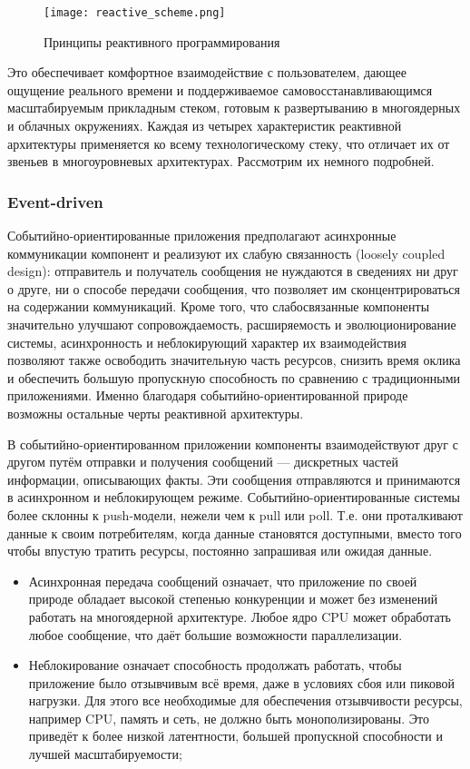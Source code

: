 \begin{figure}[ht]
\centering
  \texttt{[image: reactive\_scheme.png]}
  \caption{ Принципы реактивного программирования }
  \label{fig:reactive_scheme}
\end{figure}

Это обеспечивает комфортное взаимодействие с пользователем, дающее ощущение реального времени и поддерживаемое самовосстанавливающимся масштабируемым прикладным стеком, готовым к развертыванию в многоядерных и облачных окружениях. Каждая из четырех характеристик реактивной архитектуры применяется ко всему технологическому стеку, что отличает их от звеньев в многоуровневых архитектурах. Рассмотрим их немного подробней.

\subsubsection{Event-driven}
\label{subsub:domain:reactive_programming:event_driven}

Событийно-ориентированные приложения предполагают асинхронные коммуникации компонент и реализуют их слабую связанность (loosely coupled design): отправитель и получатель сообщения не нуждаются в сведениях ни друг о друге, ни о способе передачи сообщения, что позволяет им сконцентрироваться на содержании коммуникаций. Кроме того, что слабосвязанные компоненты значительно улучшают сопровождаемость, расширяемость и эволюционирование системы, асинхронность и неблокирующий характер их взаимодействия позволяют также освободить значительную часть ресурсов, снизить время оклика и обеспечить большую пропускную способность по сравнению с традиционными приложениями. Именно благодаря событийно-ориентированной природе возможны остальные черты реактивной архитектуры.

В событийно-ориентированном приложении компоненты взаимодействуют друг с другом путём отправки и получения сообщений --- дискретных частей информации, описывающих факты. Эти сообщения отправляются и принимаются в асинхронном и неблокирующем режиме. Событийно-ориентированные системы более склонны к push-модели, нежели чем к pull или poll. Т.е. они проталкивают данные к своим потребителям, когда данные становятся доступными, вместо того чтобы впустую тратить ресурсы, постоянно запрашивая или ожидая данные.

\begin{itemize}
  \item Асинхронная передача сообщений означает, что приложение по своей природе обладает высокой степенью конкуренции и может без изменений работать на многоядерной архитектуре. Любое ядро CPU может обработать любое сообщение, что даёт большие возможности параллелизации.
  \item Неблокирование означает способность продолжать работать, чтобы приложение было отзывчивым всё время, даже в условиях сбоя или пиковой нагрузки. Для этого все необходимые для обеспечения отзывчивости ресурсы, например CPU, память и сеть, не должно быть монополизированы. Это приведёт к более низкой латентности, большей пропускной способности и лучшей масштабируемости;
\end{itemize}


